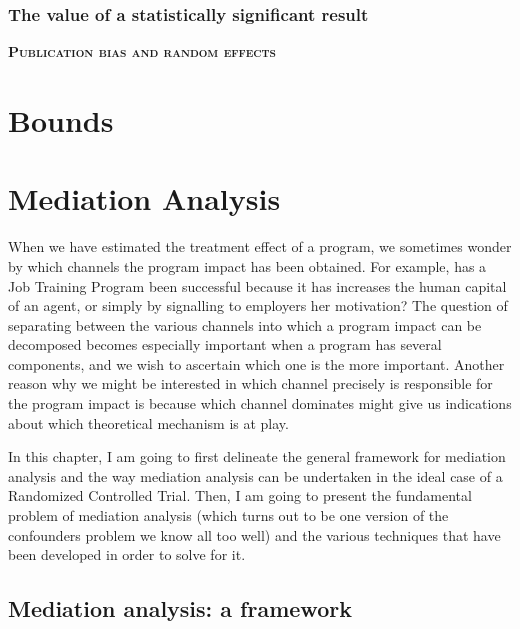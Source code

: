 \documentclass[
]{book}
\theoremstyle{definition}
\theoremstyle{definition}
\theoremstyle{definition}
\theoremstyle{definition}
\theoremstyle{remark}
\begin{document}
\hypertarget{the-value-of-a-statistically-significant-result}{%
\subsection{The value of a statistically significant result}\label{the-value-of-a-statistically-significant-result}}

\textbf{\textsc{Publication bias and random effects}}

\hypertarget{Bounds}{%
\chapter{Bounds}\label{Bounds}}

\hypertarget{mediation-analysis}{%
\chapter{Mediation Analysis}\label{mediation-analysis}}

When we have estimated the treatment effect of a program, we sometimes wonder by which channels the program impact has been obtained.
For example, has a Job Training Program been successful because it has increases the human capital of an agent, or simply by signalling to employers her motivation?
The question of separating between the various channels into which a program impact can be decomposed becomes especially important when a program has several components, and we wish to ascertain which one is the more important.
Another reason why we might be interested in which channel precisely is responsible for the program impact is because which channel dominates might give us indications about which theoretical mechanism is at play.

In this chapter, I am going to first delineate the general framework for mediation analysis and the way mediation analysis can be undertaken in the ideal case of a Randomized Controlled Trial.
Then, I am going to present the fundamental problem of mediation analysis (which turns out to be one version of the confounders problem we know all too well) and the various techniques that have been developed in order to solve for it.

\hypertarget{mediation-analysis-a-framework}{%
\section{Mediation analysis: a framework}\label{mediation-analysis-a-framework}}
\end{document}

